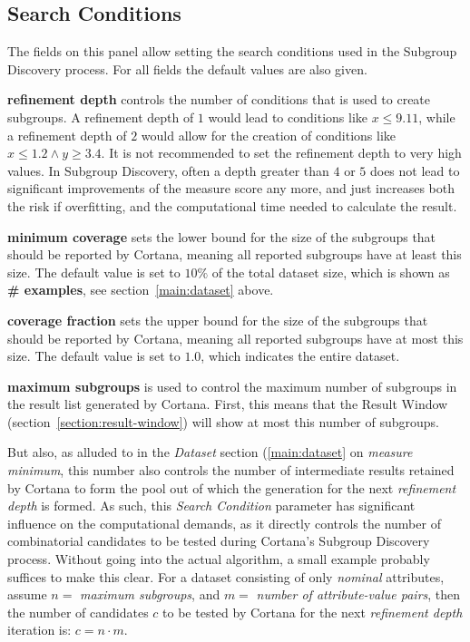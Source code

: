 \documentclass{article}
\begin{document}
\subsection{Search Conditions}
\label{main:search-conditions}

The fields on this panel allow setting the search conditions used in the Subgroup Discovery process.
For all fields the default values are also given.

\textbf{refinement depth} controls the number of conditions that is used to create subgroups.
A refinement depth of $1$ would lead to conditions like $x \leq 9.11$, while a refinement depth of $2$ would allow for the creation of conditions like $x \leq 1.2 \wedge y \geq 3.4$.
It is not recommended to set the refinement depth to very high values.
In Subgroup Discovery, often a depth greater than $4$ or $5$ does not lead to significant improvements of the measure score any more, and just increases both the risk if overfitting, and the computational time needed to calculate the result.

\textbf{minimum coverage} sets the lower bound for the size of the subgroups that should be reported by Cortana, meaning all reported subgroups have at least this size.
The default value is set to $10\%$ of the total dataset size, which is shown as \textbf{\# examples}, see section~\ref{main:dataset} above.

\textbf{coverage fraction} sets the upper bound for the size of the subgroups that should be reported by Cortana, meaning all reported subgroups have at most this size.
The default value is set to $1.0$, which indicates the entire dataset.

\textbf{maximum subgroups} is used to control the maximum number of subgroups in the result list generated by Cortana.
First, this means that the Result Window (section~\ref{section:result-window}) will show at most this number of subgroups.

But also, as alluded to in the \emph{Dataset} section (\ref{main:dataset} on \emph{measure minimum}, this number also controls the number of intermediate results retained by Cortana to form the pool out of which the generation for the next \emph{refinement depth} is formed.
As such, this \emph{Search Condition} parameter has significant influence on the computational demands, as it directly controls the number of combinatorial candidates to be tested during Cortana's Subgroup Discovery process.
Without going into the actual algorithm, a small example probably suffices to make this clear.
For a dataset consisting of only \emph{nominal} attributes, assume $n =$ \emph{maximum subgroups}, and $m =$ \emph{number of attribute-value pairs}, then the number of candidates $c$ to be tested by Cortana for the next \emph{refinement depth} iteration is: $c = n \cdot m$.
\end{document}
